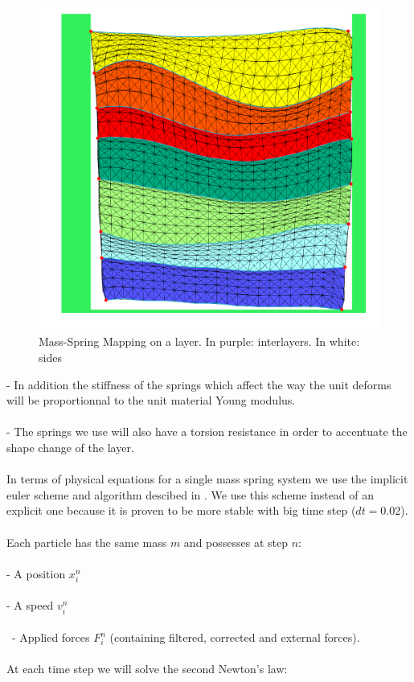 \documentclass[12pt, a4paper]{memoir} %
\begin{document}
	\begin{figure}[H]
	\centering
	\includegraphics[scale=0.5]{springMapping.png}
	\caption{Mass-Spring Mapping on a layer. In purple: interlayers. In white: sides}
	\end{figure}
	
	\indent	- In addition the stiffness of the springs which affect the way the unit deforms will be proportionnal to the unit material Young modulus. \\\\
\indent	- The springs we use will also have a torsion resistance in order to accentuate the shape change of the layer.\\\\
In terms of physical equations for a single mass spring system we use the implicit euler scheme and algorithm descibed in \citep{caltech}. We use this scheme instead of an explicit one because it is proven to be more stable with big time step ($dt = 0.02$).\\\\ 
Each particle has the same mass $m$ and possesses at step $n$:\\\\
\indent	- A position  $x_i^n$\\\\
\indent	- A speed $v_i^n$ \\\\\
\indent	- Applied forces $F_i^n$ (containing filtered, corrected and external forces).\\\\
At each time step we will solve the second Newton's law:\\
\end{document}
